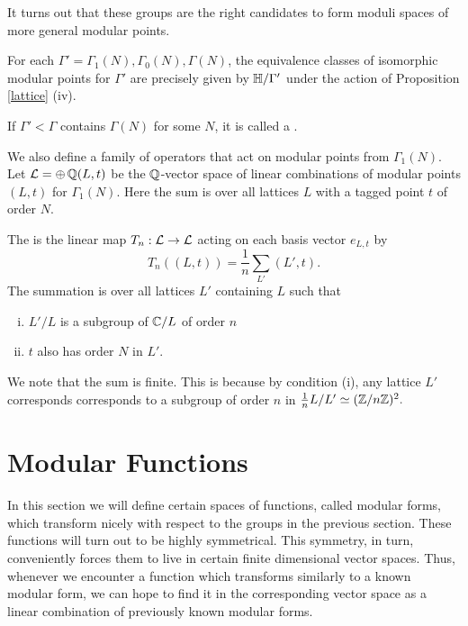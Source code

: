 \documentclass[12pt, a4paper]{report}
\begin{document}
It turns out that these groups are the right candidates to form moduli spaces of
more general modular points.

\begin{prop}
  For each $\Gamma' = \Gamma_1(N), \Gamma_0(N), \Gamma(N)$, the equivalence
  classes of isomorphic modular points for $\Gamma'$ are precisely given by
  $\mathbb{H}/\Gamma'$ under the action of Proposition \autoref{lattice} (iv).
\end{prop}
If $\Gamma' < \Gamma$ contains $\Gamma(N)$ for some $N$, it is called a
.

We also define a family of operators that act on modular points from
$\Gamma_1(N)$. Let $\mathcal{L} = \oplus \, {\mathbb Q} (L,t)$ be the ${\mathbb Q}$-vector space
of linear combinations of modular points $(L,t)$ for $\Gamma_1(N).$ Here the sum is over
all lattices $L$ with a tagged point $t$ of order $N$.

\begin{defn} \label{hecke}
  The  is the linear map $T_n : \mathcal{L} \rightarrow \mathcal{L}$ acting
  on each basis vector $e_{L,t}$ by
  \[T_n((L,t)) = \frac{1}{n} \sum\limits_{L'} (L',t).\]
  The summation is over all lattices $L'$ containing $L$ such that
  \begin{enumerate}[(i)]
  \item $L'/L$ is a subgroup of ${\mathbb C}/L$ of order $n$
  \item $t$ also has order $N$ in $L'$.
  \end{enumerate}
  We note that the sum is finite. This is because by condition (i), any lattice $L'$
  corresponds corresponds to a subgroup
  of order $n$ in $\frac{1}{n} L/L' \simeq ({\mathbb Z}/n{\mathbb Z})^2.$
\end{defn}

\section{Modular Functions}

In this section we will define certain spaces of functions, called modular forms,
which transform
nicely with respect to the groups in the previous section. These functions will
turn out to be highly symmetrical. This symmetry, in turn, conveniently forces
them to live
in certain finite dimensional vector spaces. Thus, whenever we encounter a
function which transforms similarly to a known modular form, we can hope to find
it in the corresponding vector space as a linear combination of previously known
modular forms.
\end{document}
